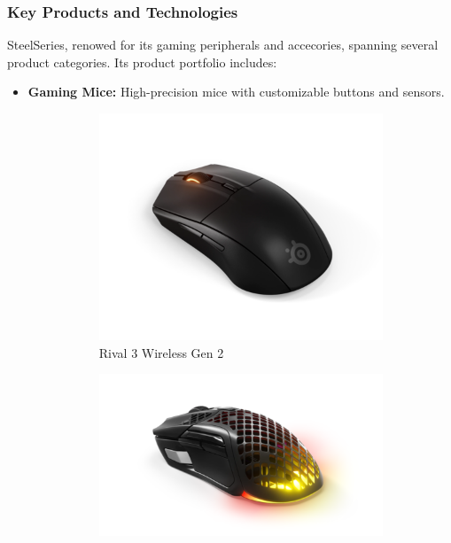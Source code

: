 \documentclass[a4paper,12pt]{report}
\begin{document}
\subsubsection{Key Products and Technologies}
SteelSeries, renowed for its gaming peripherals and accecories, spanning several product categories. Its product portfolio includes:
\begin{itemize}
    \item \textbf{Gaming Mice:} High-precision mice with customizable buttons and sensors.
    \begin{figure}[h!]
    \centering
    \begin{subfigure}[b]{0.25\textwidth}
        \includegraphics[width=\textwidth]{ressources/mouse_1.png}
        \caption{Rival 3 Wireless Gen 2}
    \end{subfigure}
    \hfill
    \begin{subfigure}[b]{0.25\textwidth}
        \includegraphics[width=\textwidth]{ressources/mouse_2.png}

\end{subfigure}
\end{figure}
\end{itemize}
\end{document}
